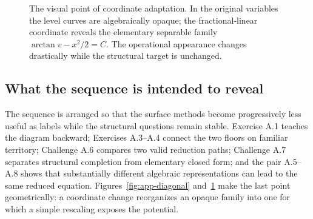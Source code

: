 \documentclass[11pt]{article}
\theoremstyle{definition}
\begin{document}
\begin{figure}[ht]
\centering
\begin{minipage}{0.47\textwidth}
\centering
{}
\end{minipage}
\hfill
\begin{minipage}{0.47\textwidth}
\centering
{}
\end{minipage}
\caption{The visual point of coordinate adaptation. In the original variables the level curves are algebraically opaque; the fractional-linear coordinate reveals the elementary separable family $\arctan v-x^2/2=C$. The operational appearance changes drastically while the structural target is unchanged.}
\label{fig:app-mobius}
\end{figure}
\FloatBarrier

\subsection{What the sequence is intended to reveal}

The sequence is arranged so that the surface methods become progressively less useful as labels while the structural questions remain stable. Exercise A.1 teaches the diagram backward; Exercises A.3--A.4 connect the two floors on familiar territory; Challenge A.6 compares two valid reduction paths; Challenge A.7 separates structural completion from elementary closed form; and the pair A.5--A.8 shows that substantially different algebraic representations can lead to the same reduced equation. Figures~\ref{fig:app-diagonal} and~\ref{fig:app-mobius} make the last point geometrically: a coordinate change reorganizes an opaque family into one for which a simple rescaling exposes the potential.
\end{document}
